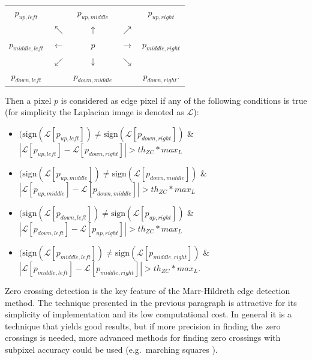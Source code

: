 \documentclass{ipol}
\numberwithin{equation}{section}
\numberwithin{table}{section}
\begin{document}
\begin{center}
\begin{tabular}{ c c c c c }
	$p_{up,left}$		& 					& $p_{up,middle}$	&					& $p_{up,right}$ 		\\
						& $\nwarrow$		& $\uparrow$		& $\nearrow$		&						\\
	$p_{middle,left}$	& $\leftarrow$		& $p$				& $\rightarrow$		& $p_{middle,right}$	\\
						& $\swarrow$		& $\downarrow$		& $\searrow$		&						\\
	$p_{down,left}$		&					& $p_{down,middle}$	&					& $p_{down,right}$.		\\  
\end{tabular}
\end{center}

Then a pixel $p$ is considered as edge pixel if any of the following conditions is true 
(for simplicity the Laplacian image is denoted as $\mathcal{L}$):
\begin{itemize}
	\item $(\mbox{sign}(\mathcal{L}[p_{up,left}])\neq\mbox{sign}(\mathcal{L}[p_{down,right}])$ \& $|\mathcal{L}[p_{up,left}]-\mathcal{L}[p_{down,right}]|>th_{ZC}*max_L$
	\item $(\mbox{sign}(\mathcal{L}[p_{up,middle}])\neq\mbox{sign}(\mathcal{L}[p_{down,middle}])$ \& $|\mathcal{L}[p_{up,middle}]-\mathcal{L}[p_{down,middle}]|>th_{ZC}*max_L$
	\item $(\mbox{sign}(\mathcal{L}[p_{down,left}])\neq\mbox{sign}(\mathcal{L}[p_{up,right}])$ \& $|\mathcal{L}[p_{down,left}]-\mathcal{L}[p_{up,right}]|>th_{ZC}*max_L$
	\item $(\mbox{sign}(\mathcal{L}[p_{middle,left}])\neq\mbox{sign}(\mathcal{L}[p_{middle,right}])$ \& $|\mathcal{L}[p_{middle,left}]-\mathcal{L}[p_{middle,right}]|>th_{ZC}*max_L$. \\
\end{itemize}

Zero crossing detection is the key feature of the Marr-Hildreth edge detection method. The technique 
presented in the previous paragraph is attractive for its simplicity of implementation and its low 
computational cost. In general it is a technique that yields good results, but if more precision in 
finding the zero crossings is needed, more advanced methods for finding zero crossings with subpixel 
accuracy could be used (e.g.\ marching squares \cite{marching_cubes}).

\end{document}
